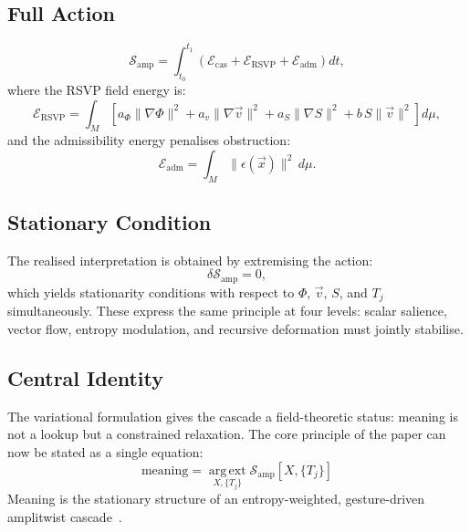 \documentclass[11pt, a4paper]{article}
\begin{document}
\subsection{Full Action}

\[
  \mathcal{S}_{\mathrm{amp}}
  = \int_{t_0}^{t_1}
  \left(
    \mathcal{E}_{\mathrm{cas}}
    + \mathcal{E}_{\mathrm{RSVP}}
    + \mathcal{E}_{\mathrm{adm}}
  \right) dt,
\]
where the RSVP field energy is:
\[
  \mathcal{E}_{\mathrm{RSVP}}
  = \int_M
  \left[
    a_\Phi\|\nabla\Phi\|^2
    + a_v\|\nabla\vec{v}\|^2
    + a_S\|\nabla S\|^2
    + b\,S\|\vec{v}\|^2
  \right] d\mu,
\]
and the admissibility energy penalises obstruction:
\[
  \mathcal{E}_{\mathrm{adm}} = \int_M \|\epsilon(\vec{x})\|^2\,d\mu.
\]

\subsection{Stationary Condition}

The realised interpretation is obtained by extremising the action:
\[
  \delta\mathcal{S}_{\mathrm{amp}} = 0,
\]
which yields stationarity conditions with respect to $\Phi$, $\vec{v}$,
$S$, and $T_j$ simultaneously. These express the same principle at four
levels: scalar salience, vector flow, entropy modulation, and recursive
deformation must jointly stabilise.

\subsection{Central Identity}

The variational formulation gives the cascade a field-theoretic status:
meaning is not a lookup but a constrained relaxation. The core principle
of the paper can now be stated as a single equation:
\[
  \boxed{
    \mathrm{meaning}
    = \operatorname*{arg\,ext}_{X,\{T_j\}}
    \mathcal{S}_{\mathrm{amp}}[X,\{T_j\}]
  }
\]
Meaning is the stationary structure of an entropy-weighted,
gesture-driven amplitwist cascade~\cite{juarrero1999,needham1997}.
\end{document}
